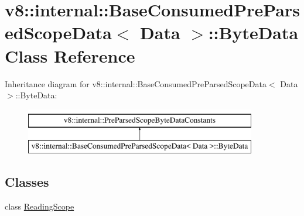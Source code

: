 \hypertarget{classv8_1_1internal_1_1BaseConsumedPreParsedScopeData_1_1ByteData}{}\section{v8\+:\+:internal\+:\+:Base\+Consumed\+Pre\+Parsed\+Scope\+Data$<$ Data $>$\+:\+:Byte\+Data Class Reference}
\label{classv8_1_1internal_1_1BaseConsumedPreParsedScopeData_1_1ByteData}
Inheritance diagram for v8\+:\+:internal\+:\+:Base\+Consumed\+Pre\+Parsed\+Scope\+Data$<$ Data $>$\+:\+:Byte\+Data\+:\begin{figure}[H]
\begin{center}
\leavevmode
\includegraphics[height=2.000000cm]{classv8_1_1internal_1_1BaseConsumedPreParsedScopeData_1_1ByteData}
\end{center}
\end{figure}
\subsection*{Classes}
\begin{DoxyCompactItemize}
\item 
class \mbox{\hyperlink{classv8_1_1internal_1_1BaseConsumedPreParsedScopeData_1_1ByteData_1_1ReadingScope}{Reading\+Scope}}
\end{DoxyCompactItemize}

